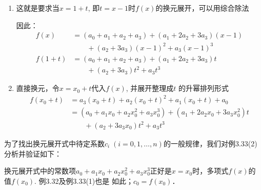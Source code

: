 \begin{solution}
\begin{enumerate}
    \item 
这就是要求当$x=1+t$, 即$t=x-1$时$f(x)$的换元展开，可以用综合除法
\begin{center}
\end{center}
因此：
\[\begin{split}
    f (x) &= (a_0+a_1 +a_2 +a_3) + (a_1 +2a_2+3a_3 ) (x-1)\\
    &\qquad +(a_2 +3a_3) (x-1)^2+a_3(x-1)^3\\
f(1+t)&=(a_0+a_1 +a_2 +a_3) +(a_1 +2a_2+3a_3)t \\
&\qquad + (a_2+3a_3) t^2+a_3t^3
\end{split}\]

\item 直接换元，令$x=x_0+t$代入$f(x)$, 并展开整理成$t$
的升幂排列形式
\[\begin{split}
    f (x_0+t) &=a_3(x_0+t) +a_2(x_0+t)^2+a_1(x_0+t)+a_0\\
&=(a_0 +a_1x_0 +a_2x_0^2+a_3x_0^3) + (a_1+2a_2x_0+3a_3 x^2_0)t\\
&\qquad + (a_2+3a_3x_0) t^2+a_3t^3
\end{split} \]
\end{enumerate}
\end{solution}

为了找出换元展开式中待定系数$c_i\; (i=0, 1,\ldots,n)$的一般规律，我们对例3.33(2)分析并验证如下：

换元展开式中的常数项$a_0+a_1x_0+a_2x_0^2+a_3x_0^3$正好是$x=x_0$时，多项式$f(x)$的值$f(x_0)$. 例3.32及例3.33(1)也是 如此；$c_0=f (x_0)$．

